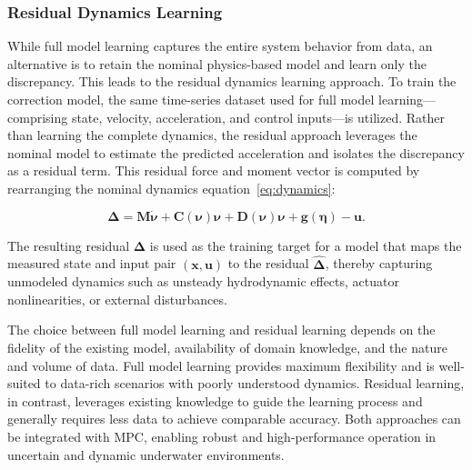 \subsubsection{Residual Dynamics Learning}
While full model learning captures the entire system behavior from data, an alternative is to retain the nominal physics-based model and learn only the discrepancy. This leads to the residual dynamics learning approach. To train the correction model, the same time-series dataset used for full model learning—comprising state, velocity, acceleration, and control inputs—is utilized. Rather than learning the complete dynamics, the residual approach leverages the nominal model to estimate the predicted acceleration and isolates the discrepancy as a residual term. This residual force and moment vector is computed by rearranging the nominal dynamics equation~\eqref{eq:dynamics}:

\begin{equation}
    \boldsymbol{\Delta }= \mathbf{M} \dot{\boldsymbol{\nu}} + \mathbf{C}(\boldsymbol{\nu}) \boldsymbol{\nu} + \mathbf{D}(\boldsymbol{\nu}) \boldsymbol{\nu} + \mathbf{g}(\boldsymbol{\eta}) - \mathbf{u}.
\end{equation}

The resulting residual $\boldsymbol{\Delta}$ is used as the training target for a model that maps the measured state and input pair $(\boldsymbol{x}, \mathbf{u})$ to the residual $\hat{\boldsymbol{\Delta}}$, thereby capturing unmodeled dynamics such as unsteady hydrodynamic effects, actuator nonlinearities, or external disturbances.



The choice between full model learning and residual learning depends on the fidelity of the existing model, availability of domain knowledge, and the nature and volume of data. Full model learning provides maximum flexibility and is well-suited to data-rich scenarios with poorly understood dynamics. Residual learning, in contrast, leverages existing knowledge to guide the learning process and generally requires less data to achieve comparable accuracy. Both approaches can be integrated with MPC, enabling robust and high-performance operation in uncertain and dynamic underwater environments.




